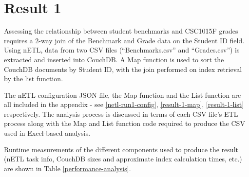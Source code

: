 \section{Result 1}
Assessing the relationship between student benchmarks and CSC1015F grades requires a 2-way join of the Benchmark and Grade data on the Student ID field. Using nETL, data from two CSV files (``Benchmarks.csv'' and ``Grades.csv'') is extracted and inserted into CouchDB. A Map function is used to sort the CouchDB documents by Student ID, with the join performed on index retrieval by the list function.

The nETL configuration JSON file, the Map function and the List function are all included in the appendix - see \ref{netl-run1-config}, \ref{result-1-map}, \ref{result-1-list} respectively. The analysis process is discussed in terms of each CSV file's ETL process along with the Map and List function code required to produce the CSV used in Excel-based analysis.

Runtime measurements of the different components used to produce the result (nETL task info, CouchDB sizes and approximate index calculation times, etc.) are shown in Table \ref{performance-analysis}.

